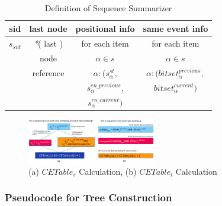 \begin{table}[!tb]
\centering
\begin{tabular}{|c|c|c|c|}
\hline
sid & last node& positional info & same event info\\
\hline
$s_{sid}$ & \textit{*}( last ) & for each item  & for each item \\
& node & $\alpha \in s$ & $\alpha \in s$ \\
& reference & $\alpha:(s_{\alpha}^{st}$, &  $\alpha:(bitset_{\alpha}^{previous},$\\
& & $s_{\alpha}^{en\_previous}$, & $bitset_{\alpha}^{current})$\\\
& &$s_{\alpha}^{en\_current})$& \\
\hline
\end{tabular}
\caption{Definition of Sequence Summarizer}
\label{table:sequence_summarizer_structure}
\end{table}

\begin{figure}[!t]
\centering
\includegraphics[width=0.5\textwidth]{CETable_calculation}
\caption{(a) $CETable_{s}$ Calculation, (b) $CETable_{i}$ Calculation} \label{figure:cetable_calculation}
\end{figure}

\subsubsection{Pseudocode for Tree Construction}


